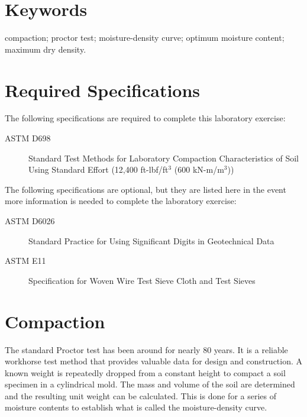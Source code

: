 \documentclass[12pt]{article}
\begin{document}
\vfill
\section*{Keywords}
\normalsize compaction; proctor test; moisture-density curve; optimum moisture content; maximum dry density.\\
\pagebreak
\begin{center}
\tableofcontents
\pagebreak
\listoftables
\listoffigures
\end{center}
\pagebreak
\section*{Required Specifications}
The following specifications are required to complete this laboratory exercise:
\begin{description}
\item[ASTM D698] Standard Test Methods for Laboratory Compaction Characteristics of Soil Using Standard Effort (12,400 ft-lbf/ft$^3$ (600 kN-m/m$^3$))
\end{description}

The following specifications are optional, but they are listed here in the event more information is needed to complete the laboratory exercise:
\begin{description}
\item[ASTM D6026] Standard Practice for Using Significant Digits in Geotechnical Data
\item[ASTM E11] Specification for Woven Wire Test Sieve Cloth and Test Sieves
\end{description}
\pagebreak
\section{Compaction}
\label{sec:intro}
\normalsize 
The standard Proctor test has been around for nearly 80 years. It is a reliable workhorse test method that provides valuable data for design and construction. A known weight is repeatedly dropped from a constant height to compact a soil specimen in a cylindrical mold. The mass and volume of the soil are determined and the resulting unit weight can be calculated. This is done for a series of moisture contents to establish what is called the moisture-density curve.
\end{document}
